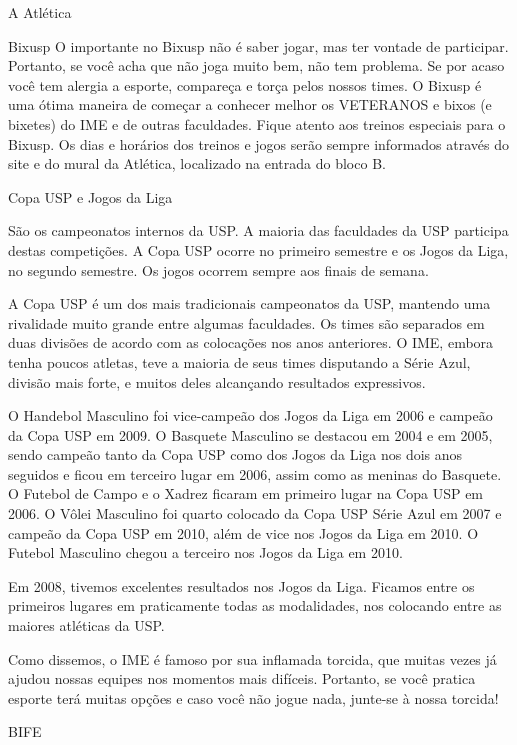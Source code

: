 \begin{secao}{A Atlética}
\begin{subsecao}{Bixusp}
    O importante no Bixusp não é saber jogar, mas ter vontade de participar. Portanto, se você acha que não joga muito bem, não tem problema. Se por acaso você tem alergia a esporte, compareça e torça pelos nossos times. O Bixusp é uma ótima maneira de começar a conhecer melhor os VETERANOS e bixos (e bixetes) do IME e de outras faculdades. Fique atento aos treinos especiais para o Bixusp. Os dias e horários dos treinos e jogos serão sempre informados através do site e do mural da Atlética, localizado na entrada do bloco B.

  \end{subsecao}
  \begin{subsecao}{Copa USP e Jogos da Liga}

    São os campeonatos internos da USP. A maioria das faculdades da USP participa destas competições. A Copa USP ocorre no primeiro semestre e os Jogos da Liga, no segundo semestre. Os jogos ocorrem sempre aos finais de semana.

    A Copa USP é um dos mais tradicionais campeonatos da USP, mantendo uma rivalidade muito grande entre algumas faculdades. Os times são separados em duas divisões de acordo com as colocações nos anos anteriores. O IME, embora tenha poucos atletas, teve a maioria de seus times disputando a Série Azul, divisão mais forte, e muitos deles alcançando resultados expressivos.

    O Handebol Masculino foi vice-campeão dos Jogos da Liga em 2006 e campeão da Copa USP em 2009. O Basquete Masculino se destacou em 2004 e em 2005, sendo campeão tanto da Copa USP como dos Jogos da Liga nos dois anos seguidos e ficou em terceiro lugar em 2006, assim como as meninas do Basquete. O Futebol de Campo e o Xadrez ficaram em primeiro lugar na Copa USP em 2006. O Vôlei Masculino foi quarto colocado da Copa USP Série Azul em 2007 e campeão da Copa USP em 2010, além de vice nos Jogos da Liga em 2010. O Futebol Masculino chegou a terceiro nos Jogos da Liga em 2010.

    Em 2008, tivemos excelentes resultados nos Jogos da Liga. Ficamos entre os primeiros lugares em praticamente todas as modalidades, nos colocando entre as maiores atléticas da USP.

    Como dissemos, o IME é famoso por sua inflamada torcida, que muitas vezes já ajudou nossas equipes nos momentos mais difíceis. Portanto, se você pratica esporte terá muitas opções e caso você não jogue nada, junte-se à nossa torcida!

  \end{subsecao}
  \begin{subsecao}{BIFE}


\end{subsecao}
\end{secao}
